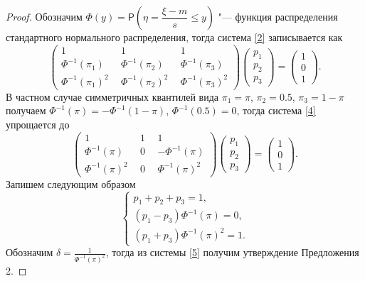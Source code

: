 \documentclass[specialist, substylefile = spbu.rtx,
subf,href,colorlinks=true, 12pt]{disser}
\begin{document}
\begin{proof}
	Обозначим $\Phi (y) = \mathsf{P}\left( \eta = \dfrac{\xi-m}{s}\leq y\right) $ "--- функция распределения стандартного нормального распределения, тогда система \eqref{2} записывается как
	\begin{equation}
		\begin{pmatrix} 1&1&1\\ 
			\Phi^{-1}(\pi_{1})~~ &  \Phi ^{-1}(\pi_{2})~~  & \Phi ^{-1}(\pi_{3}) \\ 
			\Phi ^{-1}(\pi_{1})^{2}~~&\Phi ^{-1}(\pi_{2})^{2}~~  &\Phi ^{-1}(\pi_{3})^{2}
		\end{pmatrix}
		\begin{pmatrix}p_{1}\\p_{2}\\ p_{3}\end{pmatrix}= \begin{pmatrix}1\\0\\1\end{pmatrix}. \label{4}
	\end{equation}
	В частном случае симметричных квантилей вида $\pi_{1}=\pi$, $\pi_{2}=0.5$, $\pi_{3} = 1-\pi$ получаем $\Phi ^{-1}(\pi ) = -\Phi ^{-1}(1-\pi )$, $\Phi ^{-1}(0.5) = 0$, тогда система \eqref{4} упрощается до
	\begin{equation*}
		\begin{pmatrix} 1&1&1\\ 
			\Phi^{-1}(\pi)~~ &  0~~  & -\Phi ^{-1}(\pi) \\ 
			\Phi ^{-1}(\pi)^{2}~~& 0~~  &\Phi ^{-1}(\pi)^{2}
		\end{pmatrix} 
		\begin{pmatrix}p_{1}\\p_{2}\\ p_{3}\end{pmatrix}= \begin{pmatrix}1\\0\\1\end{pmatrix}.
	\end{equation*}
	Запишем следующим образом 
	\begin{equation}
		\begin{cases}
			p_{1}+p_{2}+p_{3} =1,\\ 
			(p_{1}-p_{3})\Phi ^{-1}(\pi) =0,\\ 
			(p_{1}+p_{3})\Phi ^{-1}(\pi)^{2}=1.
		\end{cases}\label{5}
	\end{equation}
	Обозначим $\delta  = \displaystyle{\frac{1}{\Phi ^{-1}(\pi)^{2}}}$, тогда из системы \eqref{5} получим утверждение Предложения 2.
\end{proof}
\end{document}
